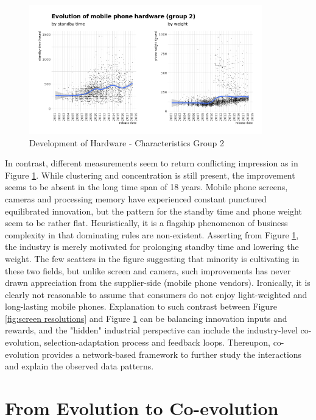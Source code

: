 \documentclass[utf8,english]{gradu3}
\begin{document}
\begin{figure}[htb]
    \centering
    \includegraphics[width=0.90\textwidth]{evo2.png}
    \caption{Development of Hardware - Characteristics Group 2}
    \label{fig:standby}
\end{figure}

In contrast, different measurements seem to return conflicting impression as in Figure \ref{fig:standby}. While clustering and concentration is still present, the improvement seems to be absent in the long time span of 18 years. Mobile phone screens, cameras and processing memory have experienced constant punctured equilibrated innovation, but the pattern for the standby time and phone weight seem to be rather flat. Heuristically, it is a flagship phenomenon of business complexity in that dominating rules are non-existent. Asserting from Figure \ref{fig:standby}, the industry is merely motivated for prolonging standby time and lowering the weight. The few scatters in the figure suggesting that minority is cultivating in these two fields, but unlike screen and camera, such improvements has never drawn appreciation from the supplier-side (mobile phone vendors). Ironically, it is clearly not reasonable to assume that consumers do not enjoy light-weighted and long-lasting mobile phones. Explanation to such contrast between Figure \ref{fig:screen resolutions} and Figure \ref{fig:standby} can be balancing innovation inputs and rewards, and the "hidden" industrial perspective can include the industry-level co-evolution, selection-adaptation process and feedback loops. Thereupon, co-evolution provides a network-based framework to further study the interactions and explain the observed data patterns.

\section{From Evolution to Co-evolution}
\end{document}
